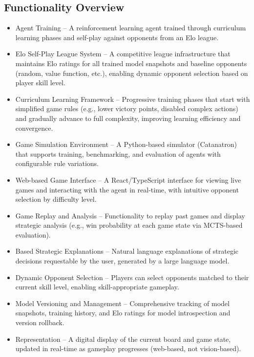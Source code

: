 \documentclass{article}
\begin{document}
\subsection{Functionality Overview}\label{subsec:functionality-overview}
\begin{itemize}
    \item {\AI{} Agent Training} – A reinforcement learning agent trained through curriculum learning phases and self-play against opponents from an Elo league.
    \item {Elo Self-Play League System} – A competitive league infrastructure that maintains Elo ratings for all trained model snapshots and baseline opponents (random, value function, etc.), enabling dynamic opponent selection based on player skill level.
    \item {Curriculum Learning Framework} – Progressive training phases that start with simplified game rules (e.g., lower victory points, disabled complex actions) and gradually advance to full complexity, improving learning efficiency and convergence.
    \item {Game Simulation Environment} – A Python-based simulator (Catanatron) that supports training, benchmarking, and evaluation of \AI{} agents with configurable rule variations.
    \item {Web-based Game Interface} – A React/TypeScript interface for viewing live games and interacting with the \AI{} agent in real-time, with intuitive opponent selection by difficulty level.
    \item {Game Replay and Analysis} – Functionality to replay past games and display strategic analysis (e.g., win probability at each game state via MCTS-based evaluation).
    \item {\LLM{} Based Strategic Explanations} – Natural language explanations of strategic decisions requestable by the user, generated by a large language model.
    \item {Dynamic Opponent Selection} – Players can select opponents matched to their current skill level, enabling skill-appropriate gameplay.
    \item {Model Versioning and Management} – Comprehensive tracking of model snapshots, training history, and Elo ratings for model introspection and version rollback.
    \item {\DigitalTwin{} Representation} – A digital display of the current board and game state, updated in real-time as gameplay progresses (web-based, not vision-based).
\end{itemize}
\end{document}

